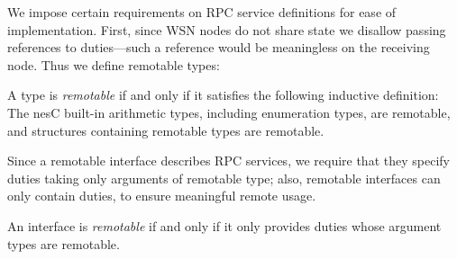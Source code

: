 We impose certain requirements on RPC service definitions for ease of
implementation. First, since WSN nodes do not share state we disallow
passing references to duties---such a reference would be meaningless on
the receiving node. Thus we define remotable types:
\begin{definition}A type is \emph{remotable} if and only if it satisfies
  the following inductive definition: The nesC built-in arithmetic
  types, including enumeration types, are remotable, and structures
  containing remotable types are remotable.
\end{definition}
Since a remotable interface describes RPC services, we require that they
specify duties taking only arguments of remotable type; also, remotable
interfaces can only contain duties, to ensure meaningful remote usage.
\begin{definition}
  An interface is \emph{remotable} if and only if it only provides
  duties whose argument types are remotable.
\end{definition}
